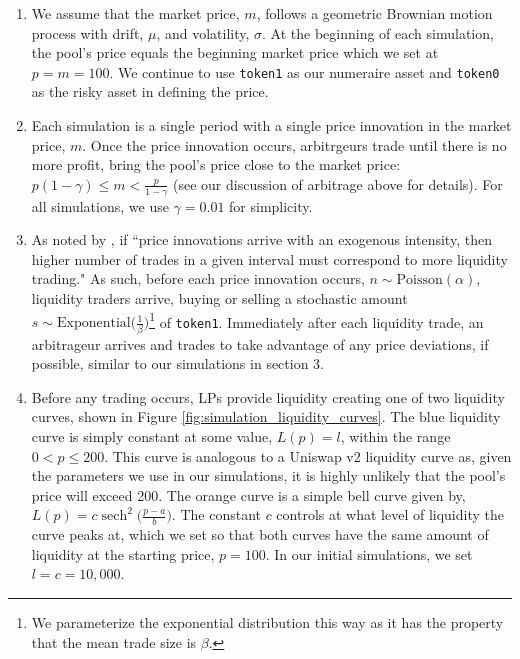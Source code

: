 \documentclass[11pt]{article}
\DeclareMathOperator{\sech}{sech}
\begin{document}
\begin{enumerate}
    \item We assume that the market price, $m$, follows a geometric Brownian motion process with drift, $\mu$, and volatility, $\sigma$. At the beginning of each simulation, the pool's price equals the beginning market price which we set at $p = m = 100$. We continue to use \texttt{token1} as our numeraire asset and \texttt{token0} as the risky asset in defining the price.

    \item Each simulation is a single period with a single price innovation in the market price, $m$. Once the price innovation occurs, arbitrgeurs trade until there is no more profit, bring the pool's price close to the market price: $p (1 - \gamma) \le m < \frac{p}{1 - \gamma}$ (see our discussion of arbitrage above for details). For all simulations, we use $\gamma = 0.01$ for simplicity.

    \item As noted by \citet{Lehar2021DecentralizedE}, if ``price innovations arrive with an exogenous intensity, then higher number of trades in a given interval must correspond to more liquidity trading." As such, before each price innovation occurs, $n \sim \text{Poisson}(\alpha)$, liquidity traders arrive, buying or selling a stochastic amount $s \sim \text{Exponential} \big( \frac{1}{\beta} \big)$\footnote{We parameterize the exponential distribution this way as it has the property that the mean trade size is $\beta$.} of \texttt{token1}. Immediately after each liquidity trade, an arbitrageur arrives and trades to take advantage of any price deviations, if possible, similar to our simulations in section 3.

    \item Before any trading occurs, LPs provide liquidity creating one of two liquidity curves, shown in Figure \ref{fig:simulation_liquidity_curves}. The blue liquidity curve is simply constant at some value, $L(p) = l$, within the range $0 < p \le 200$. This curve is analogous to a Uniswap v2 liquidity curve as, given the parameters we use in our simulations, it is highly unlikely that the pool's price will exceed 200. The orange curve is a simple bell curve given by, $L(p) = c \sech^2{ \bigl( \frac{p - a}{b} \bigl)}$. The constant $c$ controls at what level of liquidity the curve peaks at, which we set so that both curves have the same amount of liquidity at the starting price, $p = 100$. In our initial simulations, we set $l = c = 10,000$.


\end{enumerate}
\end{document}
